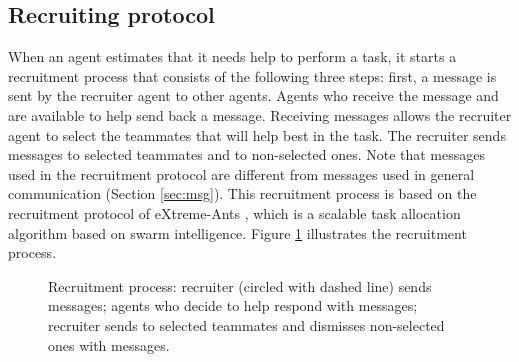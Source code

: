 \subsection{Recruiting protocol}
\label{sec:recruiting}
When an agent estimates that it needs help to perform a task, it starts a recruitment process that consists of the following three steps: first, a  message is sent by the recruiter agent to other agents. Agents who receive the  message and are available to help  send back a  message. 
Receiving  messages allows the recruiter agent to select the teammates that will help best in the task. 
The recruiter sends  messages to selected teammates and  to non-selected ones.  Note that  messages used in the recruitment protocol are different from  messages used in general communication (Section \ref{sec:msg}). This recruitment process is based on the recruitment protocol of eXtreme-Ants \cite{Santos&Bazzan2009optmas}, which is a scalable task allocation algorithm based on swarm intelligence. Figure \ref{fig:auction} illustrates the recruitment process.

\begin{figure}[ht]
  \centering

  \caption{Recruitment process:  recruiter (circled with dashed line) sends  messages;  agents who decide to help respond with  messages;  recruiter sends  to selected teammates and dismisses non-selected ones with  messages.}

 \label{fig:auction}
\end{figure}

